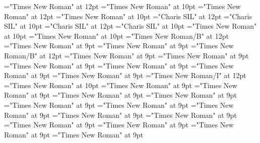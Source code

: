 \documentclass[gps1,twoside]{article}
\begin{document}
\pagestyle{plain}
\sloppy
\setlength{\parfillskip}{0pt plus 1fil}
\font\diven="Times New Roman" at 12pt
\font\spanen="Times New Roman" at 10pt
\font\divtpi="Times New Roman" at 12pt
\font\spantpi="Times New Roman" at 10pt
\font\divbzh="Charis SIL" at 12pt
\font\spanbzh="Charis SIL" at 10pt
\font\divbzhfonipa="Charis SIL" at 12pt
\font\spanbzhfonipa="Charis SIL" at 10pt
\font\spanfr="Times New Roman" at 10pt
\font\spanes="Times New Roman" at 10pt
\font\spanbzhmainheadwordentry="Times New Roman/B" at 12pt
\font\mainheadwordentrybefore="Times New Roman" at 9pt
\font\spanmainheadwordentrylastchildafter="Times New Roman" at 9pt
\font\spanmainheadwordentry="Times New Roman/B" at 12pt
\font\pronunciationpronunciationpronunciationsentrybefore="Times New Roman" at 9pt
\font\pronunciationsentryafter="Times New Roman" at 9pt
\font\formpronunciationpronunciationsentrybefore="Times New Roman" at 9pt
\font\spanformpronunciationpronunciationsentryfirstchildbefore="Times New Roman" at 9pt
\font\spanformpronunciationpronunciationsentrylastchildafter="Times New Roman" at 9pt
\font\locationpronunciationpronunciationsentryafter="Times New Roman" at 9pt
\font\locationpronunciationpronunciationsentry="Times New Roman/I" at 12pt
\font\spanwritingsystemprefixspanabbreviationlocationpronunciationpronunciationsentry="Times New Roman" at 10pt
\font\spanwritingsystemprefixspanabbreviationlocationpronunciationpronunciationsentryafter="Times New Roman" at 9pt
\font\abbreviationlocationpronunciationpronunciationsentrybefore="Times New Roman" at 9pt
\font\spanabbreviationlocationpronunciationpronunciationsentrylastchildafter="Times New Roman" at 9pt
\font\namelocationpronunciationpronunciationsentrybefore="Times New Roman" at 9pt
\font\spannamelocationpronunciationpronunciationsentrylastchildafter="Times New Roman" at 9pt
\font\aliaslocationpronunciationpronunciationsentrybefore="Times New Roman" at 9pt
\font\spanaliaslocationpronunciationpronunciationsentrylastchildafter="Times New Roman" at 9pt
\font\variantformentrybackrefsentrybefore="Times New Roman" at 9pt
\font\variantformentrybackrefsentryafter="Times New Roman" at 9pt
\font\variantentrytypevariantentrytypevariantentrytypesvariantformentrybackrefvariantformentrybackrefsentrybefore="Times New Roman" at 9pt
\font\variantentrytypesvariantformentrybackrefvariantformentrybackrefsentryafter="Times New Roman" at 9pt
\font\reverseabbrvariantentrytypevariantentrytypesvariantformentrybackrefvariantformentrybackrefsentrybefore="Times New Roman" at 9pt
\font\spanreverseabbrvariantentrytypevariantentrytypesvariantformentrybackrefvariantformentrybackrefsentrylastchildafter="Times New Roman" at 9pt
\end{document}

